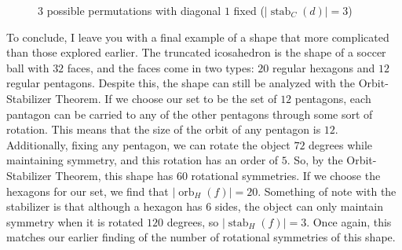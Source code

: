 \documentclass[11pt,twoside]{article}
\begin{document}
\begin{figure}[H]
\begin{minipage}{.3\linewidth}
\begin{tikzpicture}[thick,scale=2]
    
\end{tikzpicture}
\captionsetup{labelformat=empty}
\caption*{$(\alpha\beta)^2 = (234)$}
\end{minipage}
 \begin{minipage}{.3\linewidth}
\centering
{}
\captionsetup{labelformat=empty}
\caption*{$(\alpha\beta)^3 = \varepsilon$}
\end{minipage}
\caption{3 possible permutations with diagonal $1$ fixed ($|\operatorname{stab}_{C}(d)| = 3$)}
\label{sS4}
\end{figure}

To conclude, I leave you with a final example of a shape that more complicated than those explored earlier.  The truncated icosahedron is the shape of a soccer ball with $32$ faces, and the faces come in two types: $20$ regular hexagons and $12$ regular pentagons.  Despite this, the shape can still be analyzed with the Orbit-Stabilizer Theorem.  If we choose our set to be the set of $12$ pentagons, each pantagon can be carried to any of the other pentagons through some sort of rotation. This means that the size of the orbit of any pentagon is $12$.  Additionally, fixing any pentagon, we can rotate the object $72$ degrees while maintaining symmetry, and this rotation has an order of $5$.  So, by the Orbit-Stabilizer Theorem, this shape has $60$ rotational symmetries.  If we choose the hexagons for our set, we find that $|\operatorname{orb}_{H}(f)| = 20$.  Something of note with the stabilizer is that although a hexagon has $6$ sides, the object can only maintain symmetry when it is rotated $120$ degrees, so $|\operatorname{stab}_{H}(f)| = 3$.  Once again, this matches our earlier finding of the number of rotational symmetries of this shape.
\end{document}
